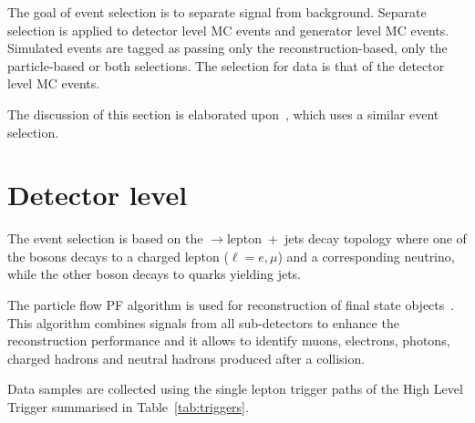 The goal of event selection is to separate signal from background. Separate selection is applied to detector level MC events and generator level MC events. Simulated events are tagged as passing only the reconstruction-based, only the particle-based or both selections. The selection for data is that of the detector level MC events.

The discussion of this section is elaborated upon~\cite{CMS-AN-2017-159}, which uses a similar event selection.

\section{Detector level}
\label{sec:detector_level}

The event selection is based on the \ttbar$\to$lepton~+~jets decay topology where one of the \PW bosons decays to a charged lepton ($\ell=e, \mu$) and a corresponding neutrino, while the other \PW boson decays to quarks yielding jets.

The particle flow PF algorithm is used for reconstruction of final state objects~\cite{Sirunyan:2017ulk}. This algorithm combines signals from all sub-detectors to enhance the reconstruction performance and it allows to identify muons, electrons, photons, charged hadrons and neutral hadrons produced after a \Pp\Pp collision.

Data samples are collected using the single lepton trigger paths of the High Level Trigger summarised in Table~\ref{tab:triggers}.

